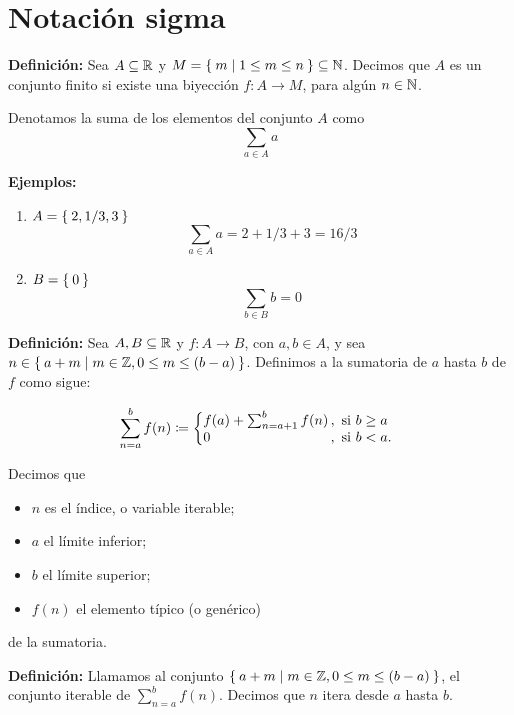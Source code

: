 \part*{Notación sigma}

\textbf{Definición:} Sea $A\propersubset \R$ y $M=\set{m|1\leq m\leq n}\propersubset \N$. Decimos que $A$ es un conjunto finito si existe una biyección $f: A \to M$, para algún $n \in \mathbb{N}$.

Denotamos la suma de los elementos del conjunto $A$ como \[\sum_{a\in A} a\]

\textbf{Ejemplos:}

\begin{enumerate}
  \item $A=\Set{2, 1/3, 3}$ \[\sum_{a\in A} a = 2 + 1/3 + 3 = 16/3\]
  \item $B=\Set{0}$ \[\sum_{b\in B} b = 0\]
\end{enumerate}

\textbf{Definición:} Sea $A, B\subseteq \mathbb{R}$ y $f:A \to B$, con $a,b\in A$, y sea $n \in \Set{a + m | m\in \mathbb{Z}, 0\leq m \leq (b-a)}$. Definimos a la sumatoria de $a$ hasta $b$ de $f$ como sigue:

\[
    \sum_{n=a}^{b} f(n) \defined \left\{
    \begin{array}{@{}l@{\thinspace}l}
    f(a) + \sum_{n=a+1}^{b} f(n) &,  \ \text{si}  \ b\geq a\\
    0 &,  \ \text{si}  \ b<a.
    \end{array} \right. \]

Decimos que
\begin{itemize}
  \item $n$ es el índice, o variable iterable;
  \item $a$ el límite inferior;
  \item $b$ el límite superior;
  \item $f(n)$ el elemento típico (o genérico)
\end{itemize}
de la sumatoria.

\textbf{Definición:} Llamamos al conjunto $\Set{a + m | m\in \mathbb{Z}, 0\leq m \leq (b-a)}$, el conjunto iterable de $\sum_{n=a}^{b} f(n)$. Decimos que $n$ itera desde $a$ hasta $b$.

